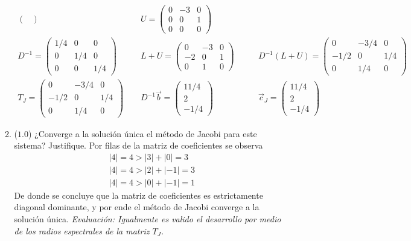 \documentclass[12pt]{article}
\begin{document}
\begin{enumerate}[leftmargin=*,widest=9]
\begin{enumerate}[label=\alph*]
\begin{eqnarray*}
\begin{pmatrix}
    \end{pmatrix} \qquad &
    U = \begin{pmatrix}
    0 & -3 & 0 \\ 0 & 0 & 1\\ 0 & 0 & 0
    \end{pmatrix} \\
    D^{-1} = \begin{pmatrix}
    1/4 & 0 & 0 \\ 0 & 1/4 & 0\\ 0 & 0 & 1/4
    \end{pmatrix} \qquad &
    L+U = \begin{pmatrix}
    0 & -3 & 0 \\ -2 & 0 & 1\\ 0 & 1 & 0
    \end{pmatrix} \qquad &
    D^{-1}(L+U) = \begin{pmatrix}
    0 & -3/4 & 0 \\ -1/2 & 0 & 1/4\\ 0 & 1/4 & 0
    \end{pmatrix}\\
    T_J = \begin{pmatrix}
    0 & -3/4 & 0 \\ -1/2 & 0 & 1/4\\ 0 & 1/4 & 0
    \end{pmatrix} &
    D^{-1}\vec{b} = \begin{pmatrix}
    11/4 \\ 2\\ -1/4
    \end{pmatrix} &
    \vec{c}_J = \begin{pmatrix}
    11/4 \\ 2\\ -1/4
    \end{pmatrix}
    \end{eqnarray*}
    \item (\(1.0\)) ¿Converge a la solución única el método de Jacobi para este sistema? Justifique.
    Por filas de la matriz de coeficientes se observa
    \begin{eqnarray*}
    |4| = 4 > |3| + |0| = 3\\
    |4| = 4 > |2| + |-1| = 3\\
    |4| = 4 > |0| + |-1| = 1
    \end{eqnarray*}
    De donde se concluye que la matriz de coeficientes es estrictamente diagonal dominante, y por ende el método de Jacobi converge a la solución única.
\textit{Evaluación: Igualmente es valido el desarrollo por medio de los radios espectrales de la matriz \(T_J\).}

\end{enumerate}
\end{enumerate}
\end{document}
